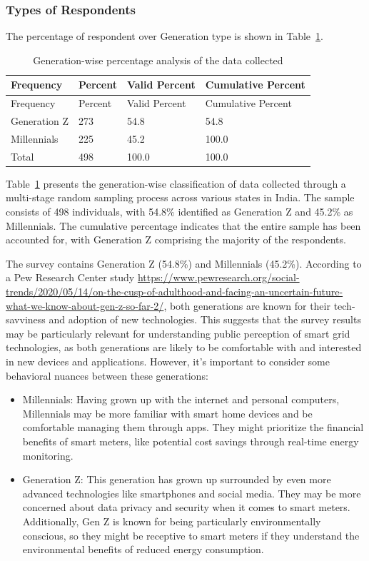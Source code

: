 \documentclass[
  letterpaper,
  DIV=11,
  numbers=noendperiod]{scrartcl}
\begin{document}
\subsubsection{Types of Respondents}\label{types-of-respondents}

The percentage of respondent over Generation type is shown in
Table~\ref{tbl-generation}.

\begin{longtable}[]{@{}llll@{}}
\caption{Generation-wise percentage analysis of the data
collected}\label{tbl-generation}\tabularnewline
\toprule\noalign{}
Frequency & Percent & Valid Percent & Cumulative Percent \\
\midrule\noalign{}
\endfirsthead
\toprule\noalign{}
Frequency & Percent & Valid Percent & Cumulative Percent \\
\midrule\noalign{}
\endhead
\bottomrule\noalign{}
\endlastfoot
Generation Z & 273 & 54.8 & 54.8 \\
Millennials & 225 & 45.2 & 100.0 \\
Total & 498 & 100.0 & 100.0 \\
\end{longtable}

Table~\ref{tbl-generation} presents the generation-wise classification
of data collected through a multi-stage random sampling process across
various states in India. The sample consists of 498 individuals, with
54.8\% identified as Generation Z and 45.2\% as Millennials. The
cumulative percentage indicates that the entire sample has been
accounted for, with Generation Z comprising the majority of the
respondents.

The survey contains Generation Z (54.8\%) and Millennials (45.2\%).
According to a Pew Research Center study
\url{https://www.pewresearch.org/social-trends/2020/05/14/on-the-cusp-of-adulthood-and-facing-an-uncertain-future-what-we-know-about-gen-z-so-far-2/},
both generations are known for their tech-savviness and adoption of new
technologies. This suggests that the survey results may be particularly
relevant for understanding public perception of smart grid technologies,
as both generations are likely to be comfortable with and interested in
new devices and applications. However, it's important to consider some
behavioral nuances between these generations:

\begin{itemize}
\item
  Millennials: Having grown up with the internet and personal computers,
  Millennials may be more familiar with smart home devices and be
  comfortable managing them through apps. They might prioritize the
  financial benefits of smart meters, like potential cost savings
  through real-time energy monitoring.
\item
  Generation Z: This generation has grown up surrounded by even more
  advanced technologies like smartphones and social media. They may be
  more concerned about data privacy and security when it comes to smart
  meters. Additionally, Gen Z is known for being particularly
  environmentally conscious, so they might be receptive to smart meters
  if they understand the environmental benefits of reduced energy
  consumption.
\end{itemize}
\end{document}
